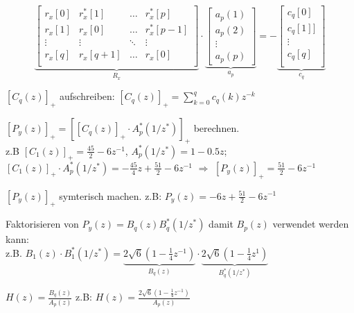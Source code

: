 \begin{aufzaehlung}
  		\small$$
\underbrace{\begin{bmatrix}                   
    		r_x[0] & r_x^*[1] & \hdots & r_x^*[p] \\   
    		r_x[1] & r_x[0] & \hdots & r_x^*[p-1] \\    
    		\vdots & \vdots & \ddots & \vdots \\     
    		r_x[q] & r_x[q+1] & \hdots & r_x[0] \\ 
		\end{bmatrix}  }_{R_x} \cdot \underbrace{\begin{bmatrix}
    		a_p(1) \\
    		a_p(2) \\
    		\vdots \\
    		a_p(p)
		\end{bmatrix}  }_{a_p}= - \underbrace{\begin{bmatrix}
    		 c_q[0]\\            
    		 c_q[1]]\\
    		\vdots \\
    		 c_q[q]\\
		\end{bmatrix}}_{c_{q}} 
		 $$ \normalsize	 
		 \item $[C_q(z)]_+$ aufschreiben: $[C_q(z)]_+ = \sum\limits_{k=0}^q c_q(k)z^{-k}$
		 \item $[P_y(z)]_+=\left[[C_q(z)]_+ \cdot A^*_p(1/z^*)\right]_+$ berechnen. \\
		 z.B $[C_1(z)]_+=\frac{45}{2}-6z^{-1}$, $A^*_p(1/z^*)=1-0.5z$; $[C_1(z)]_+ \cdot A^*_p(1/z^*)= -\frac{45}{4}z +\frac{51}{2}-6z^{-1}$ $\Rightarrow$  $[P_y(z)]_+= \frac{51}{2}-6z^{-1}$
		 \item $[P_y(z)]_+$ symterisch machen. z.B: $P_y(z) =  -6 z +\frac{51}{2}-6z^{-1}$
		 \item Faktorisieren von $P_y(z)=B_q(z)B_q^*(1/z^*)$ damit $B_p(z)$ verwendet werden kann: \\
		 z.B. $B_1(z)\cdot B_1^*(1/z^*)= \underbrace{2\sqrt{6}(1-\frac{1}{4}z^{-1})}_{B_q(z)}\cdot \underbrace{2\sqrt{6}(1-\frac{1}{4}z^{1})}_{B_q^*(1/z^*)}$
		 \item $H(z)=\frac{B_q(z)}{A_p(z)}$ z.B: $H(z)=\frac{2 \sqrt{6}(1-\frac 1 4 z^{-1})}{A_p(z)}$
\end{aufzaehlung}
		 
